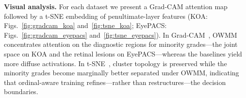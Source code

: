 \documentclass[runningheads]{svproc}
\begin{document}
\begin{table}[!ht]
\centering
\caption{Temper $\gamma$ ablation within OWMM (test, seed~123). Best macro F1 per dataset in bold; $\gamma{=}1$ collapses on EyePACS.}
\label{tab:gamma}
\small
\setlength\tabcolsep{4pt}
\end{table}

\textbf{Visual analysis.} For each dataset we present a Grad-CAM attention map followed by a t-SNE embedding of penultimate-layer features (KOA: Figs.~\ref{fig:gradcam_koa} and~\ref{fig:tsne_koa}; EyePACS: Figs.~\ref{fig:gradcam_eyepacs} and~\ref{fig:tsne_eyepacs}). In Grad-CAM~\cite{selvaraju2017gradcam}, OWMM concentrates attention on the diagnostic regions for minority grades---the joint space on KOA and the retinal lesions on EyePACS---whereas the baselines yield more diffuse activations. In t-SNE~\cite{vandermaaten2008tsne}, cluster topology is preserved while the minority grades become marginally better separated under OWMM, indicating that ordinal-aware training refines---rather than restructures---the decision boundaries.
\end{document}
